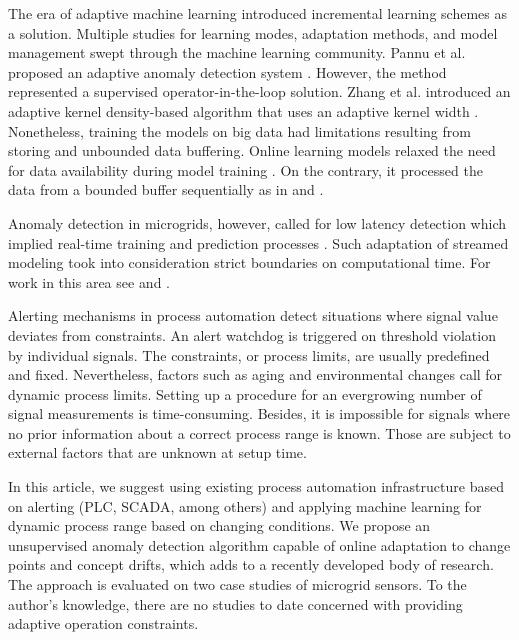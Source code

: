 The era of adaptive machine learning introduced incremental learning schemes as a solution. Multiple studies for learning modes, adaptation methods, and model management swept through the machine learning community. Pannu et al. proposed an adaptive anomaly detection system \cite{Pannu2012}. However, the method represented a supervised operator-in-the-loop solution. Zhang et al. introduced an adaptive kernel density-based algorithm that uses an adaptive kernel width \cite{Zhang201850}. Nonetheless, training the models on big data had limitations resulting from storing and unbounded data buffering. Online learning models relaxed the need for data availability during model training \cite{Gama2014}. On the contrary, it processed the data from a bounded buffer sequentially as in \cite{Bosman201514} and \cite{Ahmad2017134}.

Anomaly detection in microgrids, however, called for low latency detection which implied real-time training and prediction processes \cite{Liu2017}. Such adaptation of streamed modeling took into consideration strict boundaries on computational time. For work in this area see \cite{Wang2020114145} and \cite{Dai2022}.

Alerting mechanisms in process automation detect situations where signal value deviates from constraints. An alert watchdog is triggered on threshold violation by individual signals. The constraints, or process limits, are usually predefined and fixed. Nevertheless, factors such as aging and environmental changes call for dynamic process limits. Setting up a procedure for an evergrowing number of signal measurements is time-consuming. Besides, it is impossible for signals where no prior information about a correct process range is known. Those are subject to external factors that are unknown at setup time.

In this article, we suggest using existing process automation infrastructure based on alerting (PLC, SCADA, among others) and applying machine learning for dynamic process range based on changing conditions. We propose an unsupervised anomaly detection algorithm capable of online adaptation to change points and concept drifts, which adds to a recently developed body of research. The approach is evaluated on two case studies of microgrid sensors. To the author's knowledge, there are no studies to date concerned with providing adaptive operation constraints.


